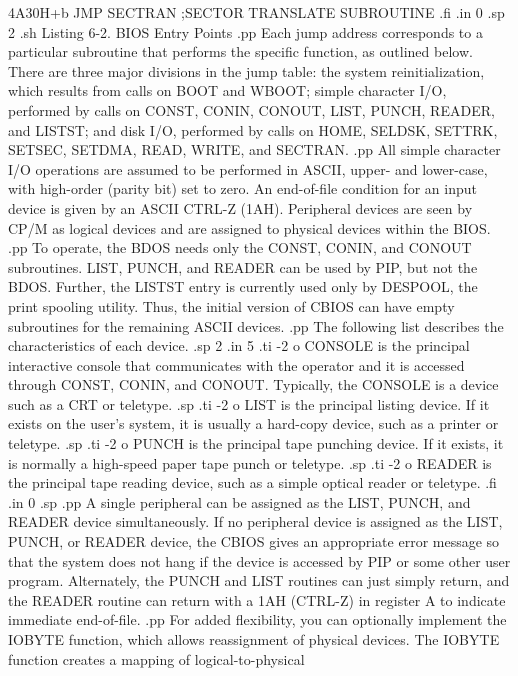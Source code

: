 4A30H+b      JMP SECTRAN    ;SECTOR TRANSLATE 
                             SUBROUTINE
.fi
.in 0
.sp 2
.sh
                 Listing 6-2.  BIOS Entry Points
.pp
Each jump address corresponds to a particular subroutine that performs the 
specific function, as outlined below.  There are three major 
divisions in the jump table:  the system reinitialization, 
which results from calls on BOOT and WBOOT; simple character I/O, 
performed by calls on CONST, CONIN, CONOUT, LIST, PUNCH, READER, 
and LISTST; and disk I/O, performed by calls on HOME, SELDSK, 
SETTRK, SETSEC, SETDMA, READ, WRITE, and SECTRAN.
.pp
All simple character I/O operations are assumed to be performed 
in ASCII, upper- and lower-case, with high-order (parity bit) set 
to zero.  An end-of-file condition for an input device is given 
by an ASCII CTRL-Z (1AH).  Peripheral devices are seen by CP/M as 
logical devices and are assigned to physical devices within the 
BIOS.  
.pp
To operate, the BDOS needs only the CONST, CONIN, and CONOUT 
subroutines.  LIST, PUNCH, and READER can be used by PIP, but not 
the BDOS.  Further, the LISTST entry is currently used only by 
DESPOOL, the print spooling utility.  Thus, the initial version 
of CBIOS can have empty subroutines for the remaining ASCII 
devices.  
.pp
The following list describes the characteristics of each device.
.sp 2
.in 5
.ti -2
o CONSOLE is the principal interactive console that communicates with the 
operator and it is accessed through CONST, CONIN, and CONOUT.  Typically, the 
CONSOLE is a device such as a CRT or teletype.
.sp
.ti -2
o LIST is the principal listing device.  If it exists on the user's system, 
it is usually a hard-copy device, such as a printer or teletype.  
.sp
.ti -2
o PUNCH is the principal tape punching device.  If it exists, it is normally a 
high-speed paper tape punch or teletype.
.sp
.ti -2
o READER is the principal tape reading device, such as a simple optical 
reader or teletype.
.fi
.in 0
.sp
.pp
A single peripheral can be assigned as the LIST, PUNCH, and 
READER device simultaneously.  If no peripheral device is 
assigned as the LIST, PUNCH, or READER device, the CBIOS 
gives an appropriate error message so that the 
system does not hang if the device is accessed by PIP or some 
other user program.  Alternately, the PUNCH and LIST routines can 
just simply return, and the READER routine can return with a 1AH 
(CTRL-Z) in register A to indicate immediate end-of-file.
.pp
For added flexibility, you can optionally implement the 
IOBYTE function, which allows reassignment of physical devices.
The IOBYTE function creates a mapping of logical-to-physical 
